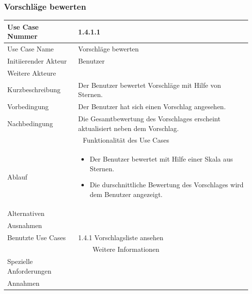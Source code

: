 \documentclass[10pt,a4paper]{article}
\begin{document}
	\subsubsection{Vorschl\"age bewerten}
	\begin{tabularx}{\textwidth}{|l|X|}
		\hline Use Case Nummer & 1.4.1.1 \\ 
		\hline Use Case Name & Vorschl\"age bewerten \\ 
		\hline Initiierender Akteur & Benutzer \\
		\hline Weitere Akteure & \\
		\hline Kurzbeschreibung & Der Benutzer bewertet Vorschl\"age mit Hilfe von Sternen. \\
		\hline Vorbedingung & Der Benutzer hat sich einen Vorschlag angesehen. \\
		\hline Nachbedingung & Die Gesamtbewertung des Vorschlages erscheint aktualisiert neben dem Vorschlag. \\
		\hline \multicolumn{2}{|c|}{Funktionalität des Use Cases}\\
		\hline Ablauf & \begin{itemize}
			\item Der Benutzer bewertet mit Hilfe einer Skala aus Sternen.
			\item Die durschnittliche Bewertung des Vorschlages wird dem Benutzer angezeigt.
		\end{itemize} \\
		\hline Alternativen &  \\
		\hline Ausnahmen &  \\
		\hline Benutzte Use Cases & 1.4.1 Vorschlagsliste ansehen \\
		\hline \multicolumn{2}{|c|}{Weitere Informationen} \\
		\hline Spezielle Anforderungen &  \\
		\hline Annahmen &  \\
		\hline
	\end{tabularx}
	
\end{document}
